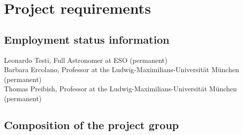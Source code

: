 \documentclass[10pt,fleqn,twoside]{article}
\begin{document}
\section{Project requirements}
\renewcommand{\leftmark}{\sc Project requirements}

\subsection{Employment status information}

Leonardo Testi, Full Astronomer at ESO (permanent)\\
Barbara Ercolano, Professor at the Ludwig-Maximilians-Universit\"at
M\"unchen (permanent)\\
Thomas Preibish, Professor at the Ludwig-Maximilians-Universit\"at
M\"unchen (permanent)

%

\subsection{Composition of the project group}
\end{document}
